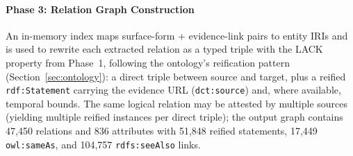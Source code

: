 %

\paragraph{Phase 3: Relation Graph Construction}
\label{sec:construction:relations}
An in-memory index maps surface-form + evidence-link pairs to entity IRIs and is used to rewrite each extracted relation as a typed triple with the LACK property from Phase~1, following the ontology's reification pattern (Section~\ref{sec:ontology}): a direct triple between source and target, plus a reified \texttt{rdf:Statement} carrying the evidence URL (\texttt{dct:source}) and, where available, temporal bounds.
The same logical relation may be attested by multiple sources (yielding multiple reified instances per direct triple); the output graph contains 47,450 relations and 836 attributes with 51,848 reified statements, 17,449 \texttt{owl:sameAs}, and 104,757 \texttt{rdfs:seeAlso} links.


